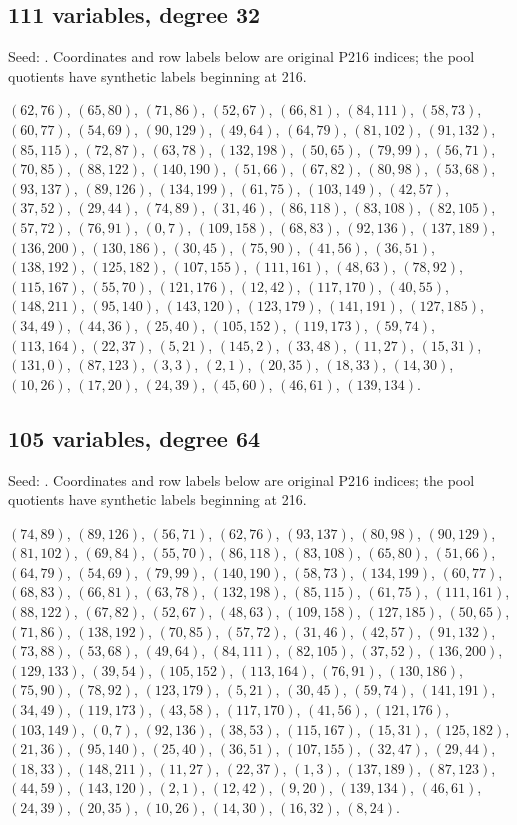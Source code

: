 \documentclass[11pt]{article}
\theoremstyle{definition}\newtheorem{definition}[theorem]{Definition}
\newcommand{\code}[1]{\texttt{\detokenize{#1}}}
\begin{document}
\subsection*{111 variables, degree 32}
Seed: \code{source209.json}. Coordinates and row labels below are original P216 indices; the pool quotients have synthetic labels beginning at 216.
{\small\raggedright
$(62,76)$, $(65,80)$, $(71,86)$, $(52,67)$, $(66,81)$, $(84,111)$, $(58,73)$, $(60,77)$, $(54,69)$, $(90,129)$, $(49,64)$, $(64,79)$, $(81,102)$, $(91,132)$, $(85,115)$, $(72,87)$, $(63,78)$, $(132,198)$, $(50,65)$, $(79,99)$, $(56,71)$, $(70,85)$, $(88,122)$, $(140,190)$, $(51,66)$, $(67,82)$, $(80,98)$, $(53,68)$, $(93,137)$, $(89,126)$, $(134,199)$, $(61,75)$, $(103,149)$, $(42,57)$, $(37,52)$, $(29,44)$, $(74,89)$, $(31,46)$, $(86,118)$, $(83,108)$, $(82,105)$, $(57,72)$, $(76,91)$, $(0,7)$, $(109,158)$, $(68,83)$, $(92,136)$, $(137,189)$, $(136,200)$, $(130,186)$, $(30,45)$, $(75,90)$, $(41,56)$, $(36,51)$, $(138,192)$, $(125,182)$, $(107,155)$, $(111,161)$, $(48,63)$, $(78,92)$, $(115,167)$, $(55,70)$, $(121,176)$, $(12,42)$, $(117,170)$, $(40,55)$, $(148,211)$, $(95,140)$, $(143,120)$, $(123,179)$, $(141,191)$, $(127,185)$, $(34,49)$, $(44,36)$, $(25,40)$, $(105,152)$, $(119,173)$, $(59,74)$, $(113,164)$, $(22,37)$, $(5,21)$, $(145,2)$, $(33,48)$, $(11,27)$, $(15,31)$, $(131,0)$, $(87,123)$, $(3,3)$, $(2,1)$, $(20,35)$, $(18,33)$, $(14,30)$, $(10,26)$, $(17,20)$, $(24,39)$, $(45,60)$, $(46,61)$, $(139,134)$.\par}

\subsection*{105 variables, degree 64}
Seed: \code{source207.json}. Coordinates and row labels below are original P216 indices; the pool quotients have synthetic labels beginning at 216.
{\small\raggedright
$(74,89)$, $(89,126)$, $(56,71)$, $(62,76)$, $(93,137)$, $(80,98)$, $(90,129)$, $(81,102)$, $(69,84)$, $(55,70)$, $(86,118)$, $(83,108)$, $(65,80)$, $(51,66)$, $(64,79)$, $(54,69)$, $(79,99)$, $(140,190)$, $(58,73)$, $(134,199)$, $(60,77)$, $(68,83)$, $(66,81)$, $(63,78)$, $(132,198)$, $(85,115)$, $(61,75)$, $(111,161)$, $(88,122)$, $(67,82)$, $(52,67)$, $(48,63)$, $(109,158)$, $(127,185)$, $(50,65)$, $(71,86)$, $(138,192)$, $(70,85)$, $(57,72)$, $(31,46)$, $(42,57)$, $(91,132)$, $(73,88)$, $(53,68)$, $(49,64)$, $(84,111)$, $(82,105)$, $(37,52)$, $(136,200)$, $(129,133)$, $(39,54)$, $(105,152)$, $(113,164)$, $(76,91)$, $(130,186)$, $(75,90)$, $(78,92)$, $(123,179)$, $(5,21)$, $(30,45)$, $(59,74)$, $(141,191)$, $(34,49)$, $(119,173)$, $(43,58)$, $(117,170)$, $(41,56)$, $(121,176)$, $(103,149)$, $(0,7)$, $(92,136)$, $(38,53)$, $(115,167)$, $(15,31)$, $(125,182)$, $(21,36)$, $(95,140)$, $(25,40)$, $(36,51)$, $(107,155)$, $(32,47)$, $(29,44)$, $(18,33)$, $(148,211)$, $(11,27)$, $(22,37)$, $(1,3)$, $(137,189)$, $(87,123)$, $(44,59)$, $(143,120)$, $(2,1)$, $(12,42)$, $(9,20)$, $(139,134)$, $(46,61)$, $(24,39)$, $(20,35)$, $(10,26)$, $(14,30)$, $(16,32)$, $(8,24)$.\par}
\end{document}
